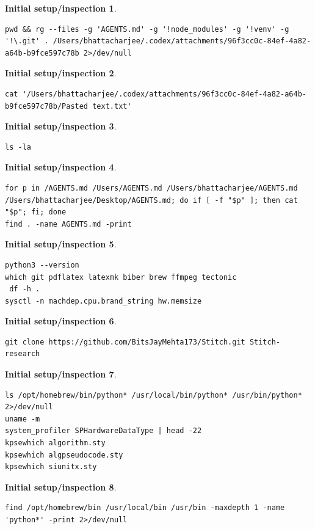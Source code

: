 \noindent\textbf{Initial setup/inspection 1}.
\begin{lstlisting}[numbers=none]
pwd && rg --files -g 'AGENTS.md' -g '!node_modules' -g '!venv' -g '!\.git' . /Users/bhattacharjee/.codex/attachments/96f3cc0c-84ef-4a82-a64b-b9fce597c78b 2>/dev/null
\end{lstlisting}

\noindent\textbf{Initial setup/inspection 2}.
\begin{lstlisting}[numbers=none]
cat '/Users/bhattacharjee/.codex/attachments/96f3cc0c-84ef-4a82-a64b-b9fce597c78b/Pasted text.txt'
\end{lstlisting}

\noindent\textbf{Initial setup/inspection 3}.
\begin{lstlisting}[numbers=none]
ls -la
\end{lstlisting}

\noindent\textbf{Initial setup/inspection 4}.
\begin{lstlisting}[numbers=none]
for p in /AGENTS.md /Users/AGENTS.md /Users/bhattacharjee/AGENTS.md /Users/bhattacharjee/Desktop/AGENTS.md; do if [ -f "$p" ]; then cat "$p"; fi; done
find . -name AGENTS.md -print
\end{lstlisting}

\noindent\textbf{Initial setup/inspection 5}.
\begin{lstlisting}[numbers=none]
python3 --version
which git pdflatex latexmk biber brew ffmpeg tectonic
 df -h .
sysctl -n machdep.cpu.brand_string hw.memsize
\end{lstlisting}

\noindent\textbf{Initial setup/inspection 6}.
\begin{lstlisting}[numbers=none]
git clone https://github.com/BitsJayMehta173/Stitch.git Stitch-research
\end{lstlisting}

\noindent\textbf{Initial setup/inspection 7}.
\begin{lstlisting}[numbers=none]
ls /opt/homebrew/bin/python* /usr/local/bin/python* /usr/bin/python* 2>/dev/null
uname -m
system_profiler SPHardwareDataType | head -22
kpsewhich algorithm.sty
kpsewhich algpseudocode.sty
kpsewhich siunitx.sty
\end{lstlisting}

\noindent\textbf{Initial setup/inspection 8}.
\begin{lstlisting}[numbers=none]
find /opt/homebrew/bin /usr/local/bin /usr/bin -maxdepth 1 -name 'python*' -print 2>/dev/null
\end{lstlisting}

